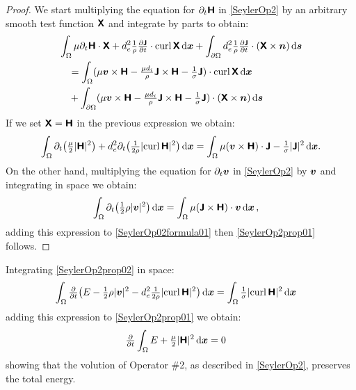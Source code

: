 \documentclass[preprint,1p]{elsarticle}
\begin{document}
\begin{proof} We start multiplying the equation for $\partial_t\boldsymbol{\mathsf{H}}$ in
\eqref{SeylerOp2} by an arbitrary smooth test function $\boldsymbol{\mathsf{X}}$ and integrate
by parts to obtain:
\begin{align*}
&\int_{\domain}\mu \partial_t \Hfield \cdot \Htest
+ d_e^2 \tfrac{1}{\rho} \tfrac{\partial \current}{\partial t}
\cdot \curl{}\Htest \dx
+ \int_{\partial\domain}
d_e^2 \tfrac{1}{\rho} \tfrac{\partial \current}{\partial t} \cdot
(\Htest \times \normal) \ds \\
%
& \ \ \ = \int_{\domain} (\mu \vel \times  \Hfield
- \tfrac{\mu d_i}{\rho} \current \times \Hfield
- \tfrac{1}{\conduct} \current) \cdot \curl{}\Htest \dx \\
%
& \ \ \ + \int_{\partial\domain} (\mu \vel \times \Hfield
- \tfrac{\mu d_i}{\rho} \current \times  \Hfield
- \tfrac{1}{\conduct} \current) \cdot
(\Htest \times \normal) \ds
\end{align*}
If we set $\boldsymbol{\mathsf{X}} = \boldsymbol{\mathsf{H}}$ in the previous expression we obtain:
\begin{align}
\label{SeylerOp02formula01}
\int_{\domain} \partial_t \big(\tfrac{\mu}{2} |\Hfield|^2\big)
+ d_e^2  \partial_t \big(\tfrac{1}{2\rho} |\curl{}\Hfield|^2 \big) \dx
%
= \int_{\domain} \mu (\vel \times  \Hfield)\cdot \current
- \tfrac{1}{\conduct} |\current|^2  \dx .
\end{align}
On the other hand, multiplying the equation for $\partial_t\boldsymbol{v}$ in
\eqref{SeylerOp2} by $\boldsymbol{v}$ and integrating in space we obtain:
\begin{align*}
\int_{\Omega} \partial_t \big(\tfrac{1}{2}\rho |\boldsymbol{v}|^2\big) \, \mathrm{d}\boldsymbol{x} &=
\int_{\Omega} \mu (\boldsymbol{\mathsf{J}} \times  \boldsymbol{\mathsf{H}})\cdot\boldsymbol{v} \, \mathrm{d}\boldsymbol{x} \, ,
\end{align*}
adding this expression to \eqref{SeylerOp02formula01} then
\eqref{SeylerOp2prop01} follows.
\end{proof}

\begin{corollary} Integrating
\eqref{SeylerOp2prop02} in space:
\begin{align*}
\int_{\Omega} \tfrac{\partial }{\partial t} \big( E - \tfrac{1}{2}\rho
|\boldsymbol{v}|^2 - d_e^2 \tfrac{1}{2\rho} |\text{curl} \, \mathbf{}\boldsymbol{\mathsf{H}}|^2\big) \, \mathrm{d}\boldsymbol{x}
&= \int_{\Omega} \tfrac{1}{\sigma} |\text{curl} \, \mathbf{}\boldsymbol{\mathsf{H}}|^2 \, \mathrm{d}\boldsymbol{x}
\end{align*}
adding this expression to \eqref{SeylerOp2prop01} we obtain:
\begin{align*}
\tfrac{\partial}{\partial t}\int_{\domain}
\totme + \tfrac{\mu}{2} |\Hfield|^2 \dx
%
&= 0
\end{align*}
showing that the volution of Operator \#2, as described in \eqref{SeylerOp2},
preserves the total energy.
\end{corollary}
\end{document}
